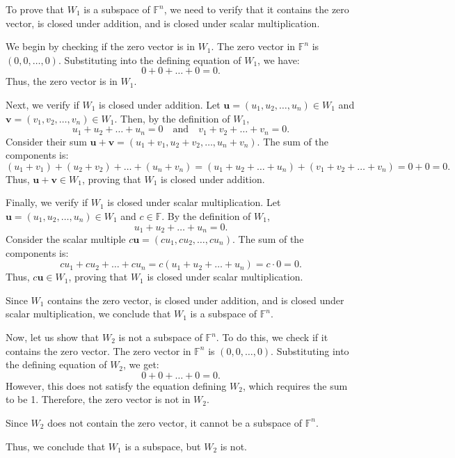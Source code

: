 \documentclass{article}
\theoremstyle{definition}
\begin{document}
To prove that \( W_1 \) is a subspace of \( \mathbb{F}^n \), we need to verify that it contains the zero vector, is closed under addition, and is closed under scalar multiplication.

We begin by checking if the zero vector is in \( W_1 \). The zero vector in \( \mathbb{F}^n \) is \( (0, 0, \dots, 0) \). Substituting into the defining equation of \( W_1 \), we have:
\[
0 + 0 + \dots + 0 = 0.
\]
Thus, the zero vector is in \( W_1 \).

Next, we verify if \( W_1 \) is closed under addition. Let \( \mathbf{u} = (u_1, u_2, \dots, u_n) \in W_1 \) and \( \mathbf{v} = (v_1, v_2, \dots, v_n) \in W_1 \). Then, by the definition of \( W_1 \),
\[
u_1 + u_2 + \dots + u_n = 0 \quad \text{and} \quad v_1 + v_2 + \dots + v_n = 0.
\]
Consider their sum \( \mathbf{u} + \mathbf{v} = (u_1 + v_1, u_2 + v_2, \dots, u_n + v_n) \). The sum of the components is:
\[
(u_1 + v_1) + (u_2 + v_2) + \dots + (u_n + v_n) = (u_1 + u_2 + \dots + u_n) + (v_1 + v_2 + \dots + v_n) = 0 + 0 = 0.
\]
Thus, \( \mathbf{u} + \mathbf{v} \in W_1 \), proving that \( W_1 \) is closed under addition.

Finally, we verify if \( W_1 \) is closed under scalar multiplication. Let \( \mathbf{u} = (u_1, u_2, \dots, u_n) \in W_1 \) and \( c \in \mathbb{F} \). By the definition of \( W_1 \),
\[
u_1 + u_2 + \dots + u_n = 0.
\]
Consider the scalar multiple \( c \mathbf{u} = (c u_1, c u_2, \dots, c u_n) \). The sum of the components is:
\[
c u_1 + c u_2 + \dots + c u_n = c(u_1 + u_2 + \dots + u_n) = c \cdot 0 = 0.
\]
Thus, \( c \mathbf{u} \in W_1 \), proving that \( W_1 \) is closed under scalar multiplication.

Since \( W_1 \) contains the zero vector, is closed under addition, and is closed under scalar multiplication, we conclude that \( W_1 \) is a subspace of \( \mathbb{F}^n \).

Now, let us show that \( W_2 \) is not a subspace of \( \mathbb{F}^n \). To do this, we check if it contains the zero vector. The zero vector in \( \mathbb{F}^n \) is \( (0, 0, \dots, 0) \). Substituting into the defining equation of \( W_2 \), we get:
\[
0 + 0 + \dots + 0 = 0.
\]
However, this does not satisfy the equation defining \( W_2 \), which requires the sum to be 1. Therefore, the zero vector is not in \( W_2 \).

Since \( W_2 \) does not contain the zero vector, it cannot be a subspace of \( \mathbb{F}^n \).

Thus, we conclude that \( W_1 \) is a subspace, but \( W_2 \) is not.
\end{document}
